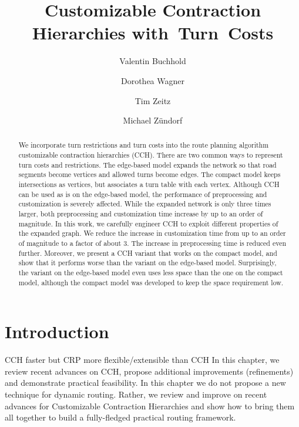 \documentclass[a4paper, english, cleveref]{lipics-v2021}
\title{Customizable Contraction Hierarchies with~Turn~Costs}
\author{Valentin Buchhold}{Karlsruhe Institute of Technology, Germany}{}{}{}
\author{Dorothea Wagner}{Karlsruhe Institute of Technology, Germany}{}{}{}
\author{Tim Zeitz}{Karlsruhe Institute of Technology, Germany}{}{}{}
\author{Michael Zündorf}{Karlsruhe Institute of Technology, Germany}{}{}{}
\begin{document}
\maketitle

\begin{abstract}
  We incorporate turn restrictions and turn costs into the route planning algorithm customizable contraction hierarchies (CCH). There are two common ways to represent turn costs and restrictions. The edge-based model expands the network so that road segments become vertices and allowed turns become edges. The compact model keeps intersections as vertices, but associates a turn table with each vertex. Although CCH can be used as is on the edge-based model, the performance of preprocessing and customization is severely affected. While the expanded network is only three times larger, both preprocessing and customization time increase by up to an order of magnitude. In this work, we carefully engineer CCH to exploit different properties of the expanded graph. We reduce the increase in customization time from up to an order of magnitude to a factor of about 3. The increase in preprocessing time is reduced even further. Moreover, we present a CCH variant that works on the compact model, and show that it performs worse than the variant on the edge-based model. Surprisingly, the variant on the edge-based model even uses less space than the one on the compact model, although the compact model was developed to keep the space requirement low.
\end{abstract}

\section{Introduction}

CCH faster but CRP more flexible/extensible than CCH
In this chapter, we review recent advances on CCH, propose additional improvements (refinements) and demonstrate practical feasibility.
In this chapter we do not propose a new technique for dynamic routing.
Rather, we review and improve on recent advances for Customizable Contraction Hierarchies and show how to bring them all together to build a fully-fledged practical routing framework.
\end{document}
